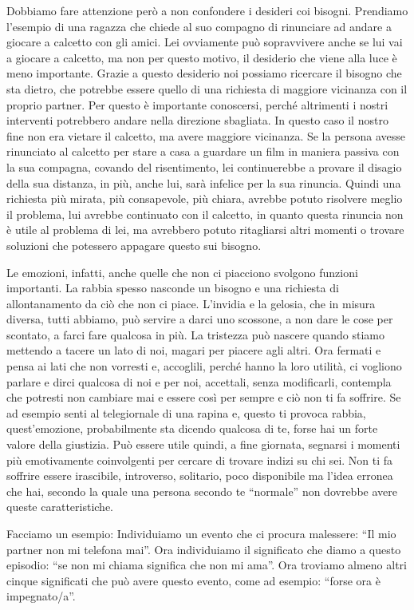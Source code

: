 \documentclass[12pt]{book} %
\begin{document}
Dobbiamo fare attenzione però a non confondere i desideri coi bisogni. Prendiamo l'esempio di una
ragazza che chiede al suo compagno di rinunciare ad andare a giocare a calcetto con gli amici. Lei ovviamente può
sopravvivere anche se lui vai a giocare a calcetto, ma non per questo motivo, il desiderio che viene alla luce è meno
importante. Grazie a questo desiderio noi possiamo ricercare il bisogno che sta dietro, che potrebbe essere quello di
una richiesta di maggiore vicinanza con il proprio partner. Per questo è importante conoscersi, perché altrimenti i nostri interventi
potrebbero andare nella direzione sbagliata. In questo caso il nostro fine non era vietare il calcetto, ma avere maggiore
vicinanza. Se la persona avesse rinunciato al calcetto per stare a casa a guardare un film in maniera passiva con la
sua compagna, covando del risentimento, lei continuerebbe a provare il disagio della sua distanza, in più, anche lui,
sarà infelice per la sua rinuncia. Quindi una richiesta più mirata, più consapevole, più chiara, avrebbe potuto
risolvere meglio il problema, lui avrebbe continuato con il calcetto, in quanto questa rinuncia non è utile al problema
di lei, ma avrebbero potuto ritagliarsi altri momenti o trovare soluzioni che potessero appagare questo sui bisogno.

Le emozioni, infatti, anche quelle che non ci piacciono svolgono funzioni importanti. La rabbia spesso nasconde un
bisogno e una richiesta di allontanamento da ciò che non ci piace.
L'invidia e la gelosia, che in misura diversa, tutti abbiamo, può servire a darci uno scossone, a non
dare le cose per scontato, a farci fare qualcosa in più. La tristezza può nascere quando stiamo mettendo a
tacere un lato di noi, magari per piacere agli altri. 
Ora fermati e pensa ai lati che non vorresti e, accoglili, perché hanno la loro utilità, ci
vogliono parlare e dirci qualcosa di noi e per noi, accettali, senza modificarli, contempla che potresti non cambiare
mai e essere così per sempre e ciò non ti fa soffrire. Se ad esempio senti al telegiornale di una rapina e, questo ti
provoca rabbia, quest'emozione, probabilmente sta dicendo qualcosa di te, forse hai un forte
valore della giustizia. Può essere utile quindi, a fine giornata, segnarsi i momenti più emotivamente coinvolgenti per
cercare di trovare indizi su chi sei. Non ti fa soffrire essere irascibile, introverso, solitario, poco disponibile ma
l'idea erronea che hai, secondo la quale una persona secondo te “normale” non dovrebbe avere queste caratteristiche.

Facciamo un esempio: Individuiamo un evento che ci procura malessere: “Il mio partner non mi telefona mai”. Ora
individuiamo il significato che diamo a questo episodio: “se non mi chiama significa che non mi ama”. Ora troviamo
almeno altri cinque significati che può avere questo evento, come ad esempio: “forse ora è impegnato/a”.
\end{document}
